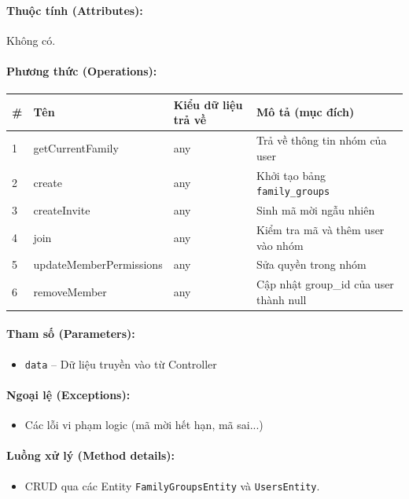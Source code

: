 \documentclass[12pt,a4paper]{article}
\begin{document}
\paragraph{Thuộc tính (Attributes):}
Không có.

\paragraph{Phương thức (Operations):}
\begin{longtable}{|p{0.6cm}|p{3.8cm}|p{2.6cm}|p{6.5cm}|}
\hline
\textbf{\#} & \textbf{Tên} & \textbf{Kiểu dữ liệu trả về} & \textbf{Mô tả (mục đích)} \\ \hline
\endhead
1 & getCurrentFamily & any & Trả về thông tin nhóm của user \\ \hline
2 & create & any & Khởi tạo bảng \texttt{family\_groups} \\ \hline
3 & createInvite & any & Sinh mã mời ngẫu nhiên \\ \hline
4 & join & any & Kiểm tra mã và thêm user vào nhóm \\ \hline
5 & updateMemberPermissions & any & Sửa quyền trong nhóm \\ \hline
6 & removeMember & any & Cập nhật group\_id của user thành null \\ \hline
\end{longtable}

\paragraph{Tham số (Parameters):}
\begin{itemize}[leftmargin=*]
    \item \texttt{data} – Dữ liệu truyền vào từ Controller
\end{itemize}


\paragraph{Ngoại lệ (Exceptions):}
\begin{itemize}[leftmargin=*]
    \item Các lỗi vi phạm logic (mã mời hết hạn, mã sai...)
\end{itemize}


\paragraph{Luồng xử lý (Method details):}
\begin{itemize}[leftmargin=*]
    \item CRUD qua các Entity \texttt{FamilyGroupsEntity} và \texttt{UsersEntity}.
\end{itemize}
\end{document}
